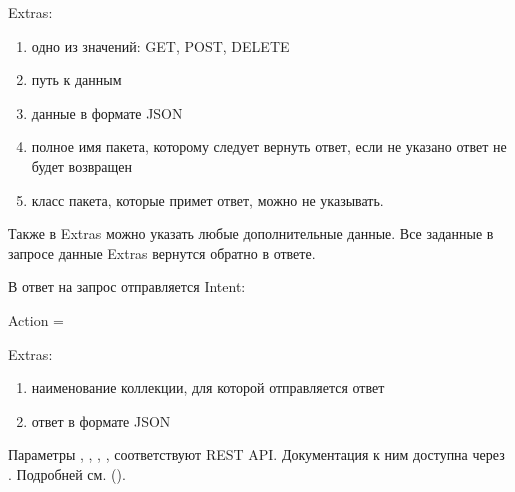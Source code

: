 \documentclass[a4paper,10pt,russian]{sphinxmanual}
\begin{document}
\sphinxAtStartPar
Extras:
\begin{enumerate}
%
\item {} 
\sphinxAtStartPar
{} \sphinxhyphen{} одно из значений: GET, POST, DELETE

\item {} 
\sphinxAtStartPar
{} \sphinxhyphen{} путь к данным

\item {} 
\sphinxAtStartPar
{} \sphinxhyphen{} данные в формате JSON

\item {} 
\sphinxAtStartPar
{} \sphinxhyphen{} полное имя пакета, которому следует вернуть ответ, если не указано \sphinxhyphen{} ответ не будет возвращен

\item {} 
\sphinxAtStartPar
{} \sphinxhyphen{} класс пакета, которые примет ответ, можно не указывать.

\end{enumerate}

\sphinxAtStartPar
Также в Extras можно указать любые дополнительные данные. Все заданные в запросе данные Extras вернутся обратно  в ответе.

\sphinxAtStartPar
В ответ на запрос отправляется Intent:

\sphinxAtStartPar
Action = 

\sphinxAtStartPar
Extras:
\begin{enumerate}
%
\item {} 
\sphinxAtStartPar
{} \sphinxhyphen{} наименование коллекции, для которой отправляется ответ

\item {} 
\sphinxAtStartPar
{} \sphinxhyphen{} ответ в формате JSON

\end{enumerate}

\sphinxAtStartPar
Параметры , , , ,  соответствуют REST API. Документация к ним доступна через .
Подробней см. {\hyperref[\detokenize{api:sub-chapter-rest-api}]{}} ().
\end{document}
